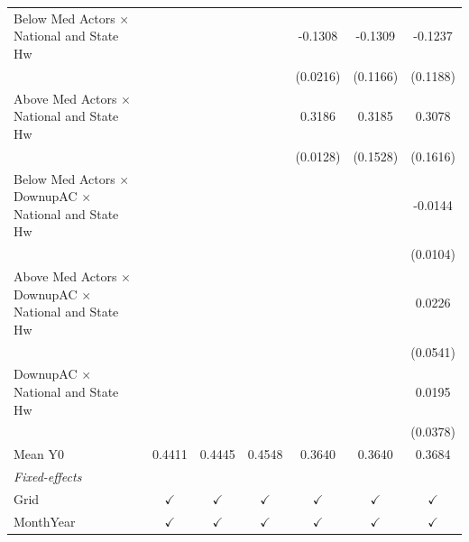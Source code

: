 \begin{table}[htbp]
\begin{tabular}{lcccccc}
      Below Med Actors $\times$ National and State Hw                     &               &               &               & -0.1308       & -0.1309       & -0.1237\\   
                                                                          &               &               &               & (0.0216)      & (0.1166)      & (0.1188)\\   
      Above Med Actors $\times$ National and State Hw                     &               &               &               & 0.3186        & 0.3185        & 0.3078\\   
                                                                          &               &               &               & (0.0128)      & (0.1528)      & (0.1616)\\   
      Below Med Actors $\times$ DownupAC $\times$ National and State Hw   &               &               &               &               &               & -0.0144\\   
                                                                          &               &               &               &               &               & (0.0104)\\   
      Above Med Actors $\times$ DownupAC $\times$ National and State Hw   &               &               &               &               &               & 0.0226\\   
                                                                          &               &               &               &               &               & (0.0541)\\   
      DownupAC $\times$ National and State Hw                             &               &               &               &               &               & 0.0195\\   
                                                                          &               &               &               &               &               & (0.0378)\\   
      \hline Mean Y0                                                      & 0.4411        & 0.4445        & 0.4548        & 0.3640        & 0.3640        & 0.3684\\  
      \midrule
      \emph{Fixed-effects}\\
      Grid                                                                & $\checkmark$  & $\checkmark$  & $\checkmark$  & $\checkmark$  & $\checkmark$  & $\checkmark$\\   
      MonthYear                                                           & $\checkmark$  & $\checkmark$  & $\checkmark$  & $\checkmark$  & $\checkmark$  & $\checkmark$\\   

\end{tabular}
\end{table}
